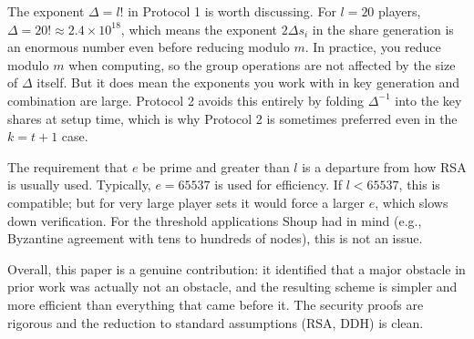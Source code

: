 The exponent $\Delta = l!$ in Protocol 1 is worth discussing. For $l = 20$ players,
$\Delta = 20! \approx 2.4 \times 10^{18}$, which means the exponent $2\Delta s_i$ in
the share generation is an enormous number even before reducing modulo $m$. In practice,
you reduce modulo $m$ when computing, so the group operations are not affected by the
size of $\Delta$ itself. But it does mean the exponents you work with in key generation
and combination are large. Protocol 2 avoids this entirely by folding $\Delta^{-1}$ into
the key shares at setup time, which is why Protocol 2 is sometimes preferred even in the
$k = t+1$ case.

The requirement that $e$ be prime and greater than $l$ is a departure from how RSA is
usually used. Typically, $e = 65537$ is used for efficiency. If $l < 65537$, this is
compatible; but for very large player sets it would force a larger $e$, which slows down
verification. For the threshold applications Shoup had in mind (e.g., Byzantine agreement
with tens to hundreds of nodes), this is not an issue.

Overall, this paper is a genuine contribution: it identified that a major obstacle in
prior work was actually not an obstacle, and the resulting scheme is simpler and more
efficient than everything that came before it. The security proofs are rigorous and the
reduction to standard assumptions (RSA, DDH) is clean.
